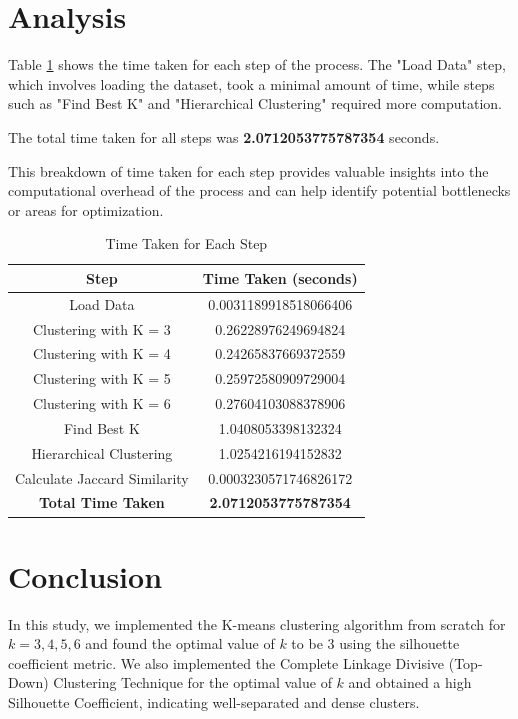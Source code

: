 \documentclass[12pt]{article}
\begin{document}
\section{Analysis}

Table \ref{tab:time_taken} shows the time taken for each step of the process. The "Load Data" step, which involves loading the dataset, took a minimal amount of time, while steps such as "Find Best K" and "Hierarchical Clustering" required more computation. 

The total time taken for all steps was \textbf{2.0712053775787354} seconds.

This breakdown of time taken for each step provides valuable insights into the computational overhead of the process and can help identify potential bottlenecks or areas for optimization.

\begin{table}[htbp]
    \centering
    \begin{tabular}{cc}
        \toprule
        \textbf{Step} & \textbf{Time Taken (seconds)} \\
        \midrule
        Load Data & 0.0031189918518066406 \\
        Clustering with K = 3 & 0.26228976249694824 \\
        Clustering with K = 4 & 0.24265837669372559 \\
        Clustering with K = 5 & 0.25972580909729004 \\
        Clustering with K = 6 & 0.27604103088378906 \\
        Find Best K & 1.0408053398132324 \\
        Hierarchical Clustering & 1.0254216194152832 \\
        Calculate Jaccard Similarity & 0.0003230571746826172 \\
        \midrule
        \textbf{Total Time Taken} & \textbf{2.0712053775787354} \\
        \bottomrule
    \end{tabular}
    \caption{Time Taken for Each Step}
    \label{tab:time_taken}
\end{table}

\section{Conclusion}

In this study, we implemented the K-means clustering algorithm from scratch for \( k = 3, 4, 5, 6 \) and found the optimal value of \( k \) to be 3 using the silhouette coefficient metric. We also implemented the Complete Linkage Divisive (Top-Down) Clustering Technique for the optimal value of \( k \) and obtained a high Silhouette Coefficient, indicating well-separated and dense clusters.
\end{document}
